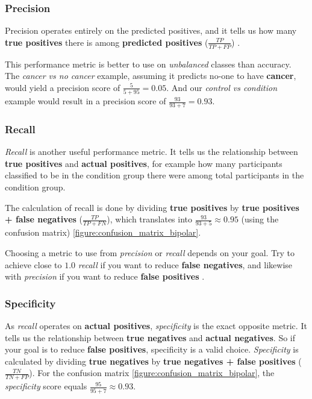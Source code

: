 \subsubsection{Precision} 

Precision operates entirely on the predicted positives, and it tells us how many \textbf{true positives} there is among \textbf{predicted positives} ($ \frac{TP}{TP + FP} $) \cite{ml_metrics}. 

This performance metric is better to use on \textit{unbalanced} classes than accuracy. The \textit{cancer vs no cancer} example, assuming it predicts no-one to have \textbf{cancer}, would yield a precision score of $ \frac{5}{5+95} = 0.05 $. And our \textit{control vs condition} example would result in a precision score of $ \frac{93}{93+7} = 0.93 $.

\subsubsection{Recall}

\textit{Recall} is another useful performance metric. It tells us the relationship between \textbf{true positives} and \textbf{actual positives}, for example how many participants classified to be in the condition group there were among total participants in the condition group.

The calculation of recall is done by dividing \textbf{true positives} by \textbf{true positives + false negatives} ($ \frac{TP}{TP+FN} $), which translates into $ \frac{93}{93+5} \approx 0.95 $ (using the confusion matrix) \ref{figure:confusion_matrix_bipolar}.

Choosing a metric to use from \textit{precision} or \textit{recall} depends on your goal. Try to achieve close to $ 1.0 $ \textit{recall} if you want to reduce \textbf{false negatives}, and likewise with \textit{precision} if you want to reduce \textbf{false positives} \cite{ml_metrics}.

\subsubsection{Specificity}

As \textit{recall} operates on \textbf{actual positives}, \textit{specificity} is the exact opposite metric. It tells us the relationship between \textbf{true negatives} and \textbf{actual negatives}. So if your goal is to reduce \textbf{false positives}, specificity is a valid choice. \textit{Specificity} is calculated by dividing \textbf{true negatives} by \textbf{true negatives + false positives} ($ \frac{TN}{TN+FP} $). For the confusion matrix \ref{figure:confusion_matrix_bipolar}, the \textit{specificity} score equals $ \frac{95}{95+7} \approx 0.93 $.

